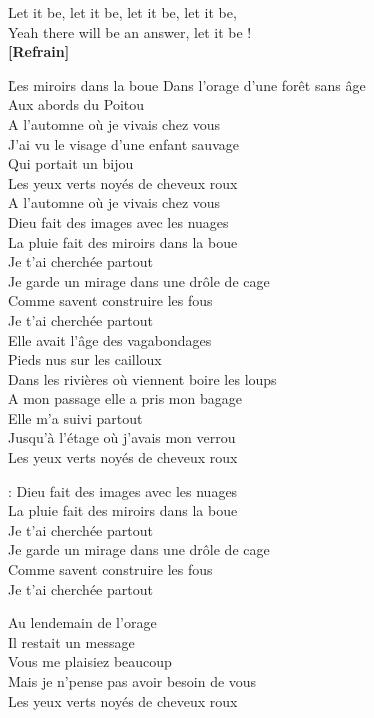 \documentclass{novel}
\begin{document}
Let it be, let it be, let it be, let it be,\\
Yeah there will be an answer, let it be !\\

\textbf{[Refrain]}

\newpage
\normalsize
\h*{Les miroirs dans la boue}
Dans l'orage d'une forêt sans âge\\
Aux abords du Poitou\\
A l'automne où je vivais chez vous\\
J'ai vu le visage d'une enfant sauvage\\
Qui portait un bijou\\
Les yeux verts noyés de cheveux roux\\

A l'automne où je vivais chez vous\\
Dieu fait des images avec les nuages\\
La pluie fait des miroirs dans la boue\\
Je t'ai cherchée partout\\
Je garde un mirage dans une drôle de cage\\
Comme savent construire les fous\\
Je t'ai cherchée partout\\

Elle avait l'âge des vagabondages\\
Pieds nus sur les cailloux\\
Dans les rivières où viennent boire les loups\\
A mon passage elle a pris mon bagage\\
Elle m'a suivi partout\\
Jusqu'à l'étage où j'avais mon verrou\\
Les yeux verts noyés de cheveux roux\\

\begin{bfseries}
[Refrain]:
Dieu fait des images avec les nuages\\
La pluie fait des miroirs dans la boue\\
Je t'ai cherchée partout\\
Je garde un mirage dans une drôle de cage\\
Comme savent construire les fous\\
Je t'ai cherchée partout\\
\end{bfseries}

Au lendemain de l'orage\\
Il restait un message\\
Vous me plaisiez beaucoup\\
Mais je n'pense pas avoir besoin de vous\\
Les yeux verts noyés de cheveux roux\\
\end{document}
